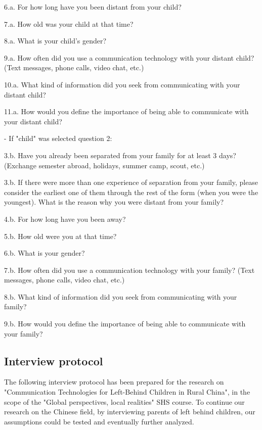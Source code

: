 6.a. For how long have you been distant from your child?

7.a. How old was your child at that time?

8.a. What is your child's gender?

9.a. How often did you use a communication technology with your distant child? (Text messages, phone calls, video chat, etc.)

10.a. What kind of information did you seek from communicating with your distant child?

11.a. How would you define the importance of being able to communicate with your distant child?

\vspace{4pt}
\noindent - If "child" was selected question 2: 

3.b. Have you already been separated from your family for at least 3 days? (Exchange semester abroad, holidays, summer camp, scout, etc.)

3.b. If there were more than one experience of separation from your family, please consider the earliest one of them through the rest of the form (when you were the youngest). What is the reason why you were distant from your family? 

4.b. For how long have you been away?

5.b. How old were you at that time?

6.b. What is your gender?

7.b. How often did you use a communication technology with your family? (Text messages, phone calls, video chat, etc.)

8.b. What kind of information did you seek from communicating with your family?

9.b. How would you define the importance of being able to communicate with your family?


\subsection{Interview protocol}
\label{appendix:interview_protocol}

The following interview protocol has been prepared for the research on "Communication Technologies for Left-Behind Children in Rural China", in the scope of the "Global perspectives, local realities" SHS course. To continue our research on the Chinese field, by interviewing parents of left behind children, our assumptions could be tested and eventually further analyzed.

